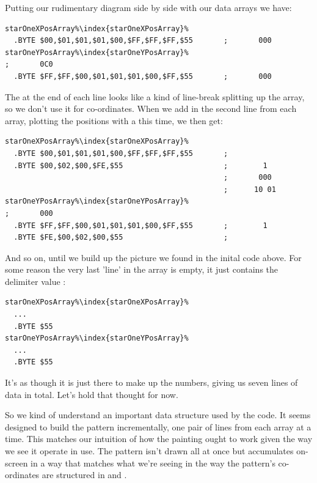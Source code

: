 Putting our rudimentary diagram side by side with our data arrays we have:
\begin{lstlisting}[escapechar=\%]
starOneXPosArray%\index{starOneXPosArray}%  
  .BYTE $00,$01,$01,$01,$00,$FF,$FF,$FF,$55       ;       000      
starOneYPosArray%\index{starOneYPosArray}%                                  ;       0C0        
  .BYTE $FF,$FF,$00,$01,$01,$01,$00,$FF,$55       ;       000      
\end{lstlisting}

The  at the end of each line looks like a kind of line-break splitting up the array, so we don't use it for
co-ordinates. 
When we add in the second line from each array, plotting the positions with a  this time, we then get:
\clearpage
\begin{lstlisting}[caption=Source code for the Star.,escapechar=\%]
starOneXPosArray%\index{starOneXPosArray}%  
  .BYTE $00,$01,$01,$01,$00,$FF,$FF,$FF,$55       ;                
  .BYTE $00,$02,$00,$FE,$55                       ;        1 
                                                  ;       000      
                                                  ;      10 01       
starOneYPosArray%\index{starOneYPosArray}%                                  ;       000
  .BYTE $FF,$FF,$00,$01,$01,$01,$00,$FF,$55       ;        1  
  .BYTE $FE,$00,$02,$00,$55                       ; 
\end{lstlisting}

And so on, until we build up the picture we found in the inital code above. For some reason the very last 'line' in the 
array is empty, it just contains the delimiter value :

\begin{lstlisting}[escapechar=\%]
starOneXPosArray%\index{starOneXPosArray}%  
  ...
  .BYTE $55  
starOneYPosArray%\index{starOneYPosArray}%  
  ...
  .BYTE $55      
\end{lstlisting}

It's as though it is just there to make up the numbers, giving us
seven lines of data in total. Let's hold that thought for now.

So we kind of understand an important data structure used
by the code. It seems designed to build the pattern incrementally, one pair of lines from each array at a time.
This matches our intuition of how the painting ought to work given the way we see it operate in use. The pattern isn't drawn
all at once but accumulates on-screen in a way that matches what we're seeing in the way the pattern's co-ordinates
are structured in  and .

